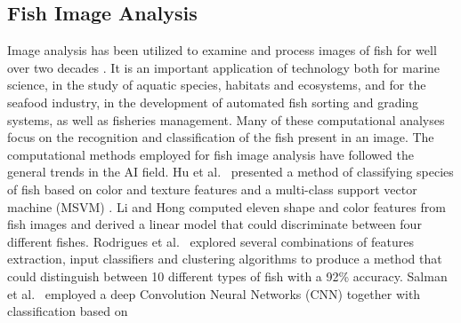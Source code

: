 \documentclass[conference]{IEEEtran}
\begin{document}
\subsection{Fish Image Analysis}

Image analysis has been utilized to examine and process images of fish
for well over two decades \cite{Zion2000InvivoFS,Saberioon2017ApplicationOM}. It is an important
application of technology both for marine science, in the study of aquatic
species, habitats and ecosystems, and for the seafood industry, in the
development of automated fish sorting and grading systems, as well as
fisheries management. Many of these computational analyses focus on
the recognition and classification
of the fish present in an image.  The computational methods employed for
fish image analysis have followed the general trends in the AI field.
Hu et al.~\cite{HuJing2012Fscb} presented a method of classifying species
of fish based on color and texture features and a multi-class support
vector machine (MSVM) \cite{Vapnik1999AOS}.
Li and Hong \cite{Li2014IdentificationOF} computed eleven shape and color
features from fish images and derived a linear model
that could discriminate between four different fishes.
Rodrigues et al.~\cite{RodriguesMarcoT.A2015Ecda} explored several
combinations of features extraction, input classifiers and clustering
algorithms to produce a method that could distinguish between 10 different
types of fish with a 92\% accuracy.
Salman et al.~\cite{Salman2016FishSC} employed a deep Convolution Neural
Networks (CNN) \cite{LeCun2004LMG} together with classification based on
\end{document}
